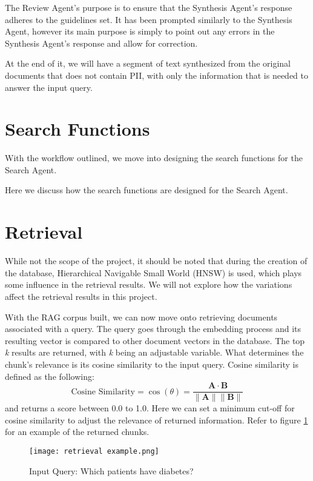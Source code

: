 The Review Agent's purpose is to ensure that the Synthesis Agent's response adheres to the guidelines set. It has been prompted similarly to the Synthesis Agent, however its main purpose is simply to point out any errors in the Synthesis Agent's response and allow for correction.

At the end of it, we will have a segment of text synthesized from the original documents that does not contain PII, with only the information that is needed to answer the input query.
\section{Search Functions}

With the workflow outlined, we move into designing the search functions for the Search Agent.

Here we discuss how the search functions are designed for the Search Agent.

\section{Retrieval}
While not the scope of the project, it should be noted that during the creation of the database, Hierarchical Navigable Small World (HNSW) is used, which plays some influence in the retrieval results. We will not explore how the variations affect the retrieval results in this project.

With the RAG corpus built, we can now move onto retrieving documents associated with a query.
The query goes through the embedding process and its resulting vector is compared to other document vectors in the database.
The top \textit{k} results are returned, with \textit{k} being an adjustable variable.
What determines the chunk's relevance is its cosine similarity to the input query.
Cosine similarity is defined as the following:
\[
	\text{Cosine Similarity} = \cos(\theta) = \frac{\mathbf{A} \cdot \mathbf{B}}{\|\mathbf{A}\| \|\mathbf{B}\|}
\]
and returns a score between 0.0 to 1.0.
Here we can set a minimum cut-off for cosine similarity to adjust the relevance of returned information.
Refer to figure \ref{fig:RetrievalExample} for an example of the returned chunks.

\begin{figure}
	\centering
	\texttt{[image: retrieval example.png]}
	\caption{Input Query: Which patients have diabetes?}
	\label{fig:RetrievalExample}
\end{figure}
